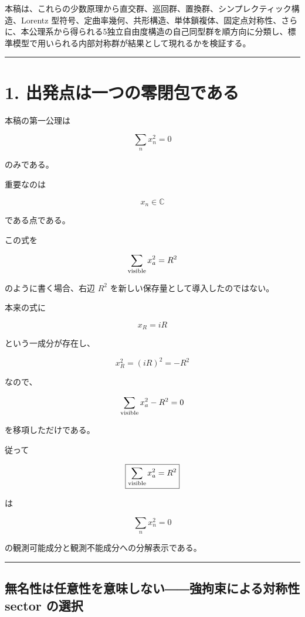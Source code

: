 \documentclass[
  a4paper,
]{ltjsarticle}
\begin{document}
本稿は、これらの少数原理から直交群、巡回群、置換群、シンプレクティック構造、Lorentz
型符号、定曲率幾何、共形構造、単体鎖複体、固定点対称性、さらに、本公理系から得られる5独立自由度構造の自己同型群を順方向に分類し、標準模型で用いられる内部対称群が結果として現れるかを検証する。

\begin{center}\rule{0.5\linewidth}{0.5pt}\end{center}

\section{1.
出発点は一つの零閉包である}\label{ux51faux767aux70b9ux306fux4e00ux3064ux306eux96f6ux9589ux5305ux3067ux3042ux308b}

本稿の第一公理は

\[
\boxed{
\sum_n x_n^2=0
}
\]

のみである。

重要なのは

\[
x_n\in\mathbb C
\]

である点である。

この式を

\[
\sum_{\rm visible} x_a^2
=
R^2
\]

のように書く場合、右辺 \(R^2\) を新しい保存量として導入したのではない。

本来の式に

\[
x_R=iR
\]

という一成分が存在し、

\[
x_R^2=(iR)^2=-R^2
\]

なので、

\[
\sum_{\rm visible}x_a^2-R^2=0
\]

を移項しただけである。

従って

\[
\boxed{
\sum_{\rm visible}x_a^2=R^2
}
\]

は

\[
\boxed{
\sum_nx_n^2=0
}
\]

の観測可能成分と観測不能成分への分解表示である。

\begin{center}\rule{0.5\linewidth}{0.5pt}\end{center}

\subsection{無名性は任意性を意味しない――強拘束による対称性 sector
の選択}\label{ux7121ux540dux6027ux306fux4efbux610fux6027ux3092ux610fux5473ux3057ux306aux3044ux5f37ux62d8ux675fux306bux3088ux308bux5bfeux79f0ux6027-sector-ux306eux9078ux629e}
\end{document}
